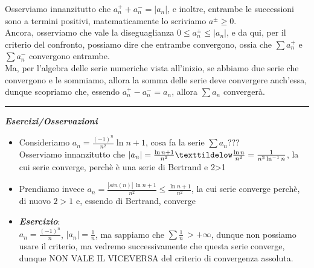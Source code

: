 \documentclass{article}
\theoremstyle{definition}
\begin{document}
Osserviamo innanzitutto che $a_n^+ + a_n^- = |a_n|$, e inoltre, entrambe le successioni sono a termini positivi, matematicamente lo scriviamo $a^\pm \geqslant 0$.
\\
Ancora, osserviamo che vale la diseguaglianza $0 \leqslant a_n^\pm \leqslant |a_n|$, e da qui, per il criterio del confronto, possiamo dire che entrambe convergono, ossia che $\sum a_n^+$ e $\sum a_n^-$ convergono entrambe.
\\
Ma, per l'algebra delle serie numeriche vista all'inizio, se abbiamo due serie che convergono e le sommiamo, allora la somma delle serie deve convergere anch'essa, dunque scopriamo che, essendo $a_n^+ - a_n^- = a_n$, allora $\sum a_n$ convergerà.
\\
\vspace{15pt}
\hrule
\vspace{15pt}
\begin{center}
    \textbf{\textit{Esercizi/Osservazioni}}
\end{center}
\begin{itemize}
    \item Consideriamo $a_n=\frac{(-1)^n}{n^2}\ln{n+1}$, cosa fa la serie $\sum a_n$???
    \\
    Osserviamo innanzitutto che $|a_n|= \frac{\ln{n+1}}{n^2} \texttildelow \frac{\ln{n}}{n^2}= \frac{1}{n^2 \ln^{-1}{n}}$, la cui serie converge, perchè è una serie di Bertrand e 2>1 
    \item Prendiamo invece $a_n=\frac{|sin(n)| \, \ln{n+1}}{n^2} \leqslant \frac{\ln{n+1}}{n^2}$, la cui serie converge perchè, di nuovo $2 > 1$ e, essendo di Bertrand, converge 
    \item \textbf{\textit{Esercizio}}:
    \\
    $a_n= \frac{(-1)^n}{n}$, $|a_n|=\frac{1}{n}$, ma sappiamo che $\sum \frac{1}{n} \, > +\infty$, dunque non possiamo usare il criterio, ma vedremo successivamente che questa serie converge, dunque NON VALE IL VICEVERSA del criterio di convergenza assoluta.
\end{itemize}
\end{document}
